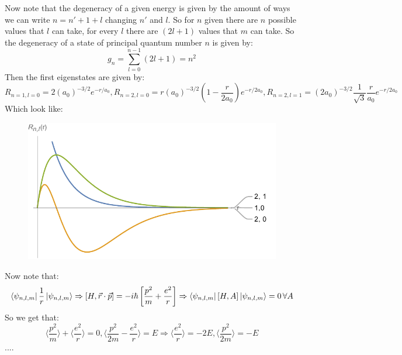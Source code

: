 \documentclass[10pt,a4paper]{book}
\begin{document}
Now note that the degeneracy of a given energy is given by the amount of ways we can write $n = n' + 1 + l$ changing $n'$ and $l$. So for $n$ given there are $n$ possible values that $l$ can take, for every $l$ there are $(2l +1)$ values that $m$ can take. So the degeneracy of a state of principal quantum number $n$ is given by:
\[
g_n = \sum_{l = 0}^{n-1} (2l + 1) = n^2
\]
Then the first eigenstates are given by:
\[
R_{n = 1, l =0} = 2(a_0)^{-3/2} e^{-r/a_0}, R_{n = 2, l = 0} = r (a_0)^{-3/2} (1 - \frac{r}{2 a_0})e^{-r/2a_0}, R_{n = 2, l = 1} = (2 a_0)^{-3/2} \frac{1}{\sqrt{3}} \frac{r}{a_0}e^{-r/2a_0}
\]
Which look like:
\begin{figure}[h!]
\centering
\includegraphics[width = 0.6 \textwidth]{graphs/hydrogen_atom_R_Plots}
\end{figure}

Now note that:
\[
\bra{\psi_{n,l,m}} \frac{1}{r} \ket{\psi_{n,l,m}} \Rightarrow [H, \vec{r} \cdot \vec{p}] = - i\hbar \left[\frac{p^2}{m} + \frac{e^2}{r}\right] \Rightarrow \bra{\psi_{n, l, m}} [H, A] \ket{\psi_{n,l,m}} = 0\, \forall A 
\]
So we get that:
\[
\langle \frac{p^2}{m} \rangle + \langle \frac{e^2}{r} \rangle = 0, \langle \frac{p^2}{2m} - \frac{e^2}{r} \rangle = E \Rightarrow \langle \frac{e^2}{r} \rangle = -2 E, \langle \frac{p^2}{2m} \rangle = - E
\]
....
\end{document}
